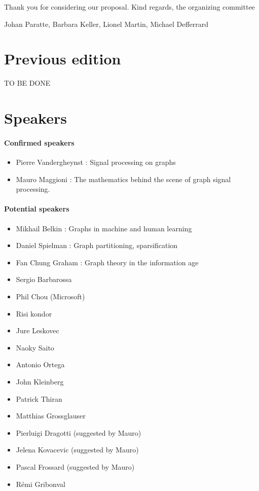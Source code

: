 \documentclass[a4paper]{scrartcl}
\newcommand{\nati}[1]{{\textcolor[rgb]{.1,.6,.1}{#1}}}
\begin{document}
Thank you for considering our proposal. Kind regards, the organizing committee

\vspace{0.5cm}

Johan Paratte, Barbara Keller, Lionel Martin, Michael Defferrard









\newpage

\section{Previous edition}
\nati{TO BE DONE}

\section{Speakers}

\paragraph{Confirmed speakers}
\begin{itemize}
	\item Pierre Vandergheynst : Signal processing on graphs
	\item Mauro Maggioni : The mathematics behind the scene of graph signal processing.
\end{itemize}

\paragraph{Potential speakers}
\begin{itemize}
	\item Mikhail Belkin : Graphs in machine and human learning
	\item Daniel Spielman : Graph partitioning, sparsification
	\item Fan Chung Graham : Graph theory in the information age
	\item Sergio Barbarossa
	\item Phil Chou (Microsoft)
	\item Risi kondor
	\item Jure Leskovec
	\item Naoky Saito
	\item Antonio Ortega
	\item John Kleinberg
	\item Patrick Thiran
	\item Matthias Grossglauser
	\item Pierluigi Dragotti (suggested by Mauro)
	\item Jelena Kovacevic (suggested by Mauro)
	\item Pascal Frossard (suggested by Mauro)
	\item Rémi Gribonval
\end{itemize}
\end{document}
